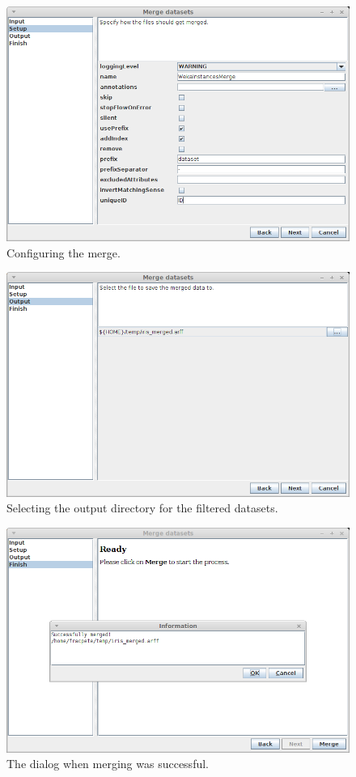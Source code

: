 \begin{figure}[htb]
  \centering
  \includegraphics[width=12.0cm]{images/merge_datasets2.png}
  \caption{Configuring the merge.}
  \label{merge_datasets2}
\end{figure}

\begin{figure}[htb]
  \centering
  \includegraphics[width=12.0cm]{images/merge_datasets3.png}
  \caption{Selecting the output directory for the filtered datasets.}
  \label{merge_datasets3}
\end{figure}

\begin{figure}[htb]
  \centering
  \includegraphics[width=12.0cm]{images/merge_datasets4.png}
  \caption{The dialog when merging was successful.}
  \label{merge_datasets4}
\end{figure}

